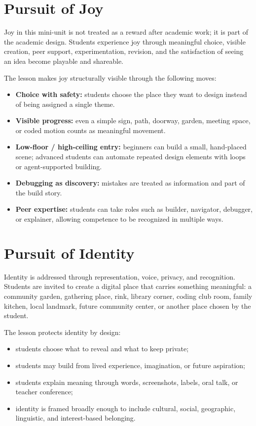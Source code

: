 \documentclass[11pt]{article}
\begin{document}
\section*{Pursuit of Joy}

Joy in this mini-unit is not treated as a reward after academic work; it is part of the academic design. Students experience joy through meaningful choice, visible creation, peer support, experimentation, revision, and the satisfaction of seeing an idea become playable and shareable.

The lesson makes joy structurally visible through the following moves:
\begin{itemize}[leftmargin=*]
    \item \textbf{Choice with safety:} students choose the place they want to design instead of being assigned a single theme.
    \item \textbf{Visible progress:} even a simple sign, path, doorway, garden, meeting space, or coded motion counts as meaningful movement.
    \item \textbf{Low-floor / high-ceiling entry:} beginners can build a small, hand-placed scene; advanced students can automate repeated design elements with loops or agent-supported building.
    \item \textbf{Debugging as discovery:} mistakes are treated as information and part of the build story.
    \item \textbf{Peer expertise:} students can take roles such as builder, navigator, debugger, or explainer, allowing competence to be recognized in multiple ways.
\end{itemize}

\section*{Pursuit of Identity}

Identity is addressed through representation, voice, privacy, and recognition. Students are invited to create a digital place that carries something meaningful: a community garden, gathering place, rink, library corner, coding club room, family kitchen, local landmark, future community center, or another place chosen by the student.

The lesson protects identity by design:
\begin{itemize}[leftmargin=*]
    \item students choose what to reveal and what to keep private;
    \item students may build from lived experience, imagination, or future aspiration;
    \item students explain meaning through words, screenshots, labels, oral talk, or teacher conference;
    \item identity is framed broadly enough to include cultural, social, geographic, linguistic, and interest-based belonging.
\end{itemize}
\end{document}
